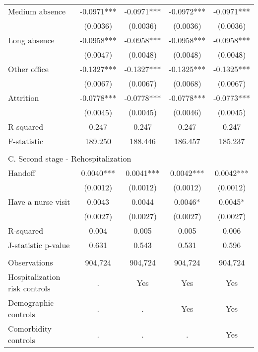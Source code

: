 \documentclass[final,12pt, notitlepage]{article}
\begin{document}
\begin{singlespace}
\begin{table}[H]
\begin{threeparttable}
{\begin{tabular*}{\textwidth}{l@{\extracolsep{\fill}}*{4}{c}}
Medium absence      &     -0.0971***&     -0.0971***&     -0.0972***&     -0.0971***\\
                    &    (0.0036)   &    (0.0036)   &    (0.0036)   &    (0.0036)   \\
Long absence        &     -0.0958***&     -0.0958***&     -0.0958***&     -0.0958***\\
                    &    (0.0047)   &    (0.0048)   &    (0.0048)   &    (0.0048)   \\
Other office        &     -0.1327***&     -0.1327***&     -0.1325***&     -0.1325***\\
                    &    (0.0067)   &    (0.0067)   &    (0.0068)   &    (0.0067)   \\
Attrition           &     -0.0778***&     -0.0778***&     -0.0778***&     -0.0773***\\
                    &    (0.0045)   &    (0.0045)   &    (0.0046)   &    (0.0045)   \\
R-squared           &       0.247   &       0.247   &       0.247   &       0.247   \\
F-statistic         &     189.250   &     188.446   &     186.457   &     185.237   \\
\\
\multicolumn{5}{l}{C. Second stage - Rehospitalization} \\
Handoff             &      0.0040***&      0.0041***&      0.0042***&      0.0042***\\
                    &    (0.0012)   &    (0.0012)   &    (0.0012)   &    (0.0012)   \\
Have a nurse visit  &      0.0043   &      0.0044   &      0.0046*  &      0.0045*  \\
                    &    (0.0027)   &    (0.0027)   &    (0.0027)   &    (0.0027)   \\
R-squared           &       0.004   &       0.005   &       0.005   &       0.006   \\
J-statistic p-value &       0.631   &       0.543   &       0.531   &       0.596   \\
\\
\midrule
Observations        &      904,724   &      904,724   &      904,724   &      904,724   \\
Hospitalization risk controls & . & Yes & Yes & Yes \\
Demographic controls & . & . & Yes & Yes \\
 Comorbidity controls & . & . & . & Yes \\

\end{tabular*}}
\end{threeparttable}
\end{table}
\end{singlespace}
\end{document}

